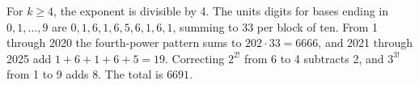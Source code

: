 For $k\ge4$, the exponent is divisible by 4. The units digits for bases ending in $0,1,\ldots,9$ are $0,1,6,1,6,5,6,1,6,1$, summing to 33 per block of ten. From 1 through 2020 the fourth-power pattern sums to $202\cdot33=6666$, and 2021 through 2025 add $1+6+1+6+5=19$. Correcting $2^{2!}$ from 6 to 4 subtracts 2, and $3^{3!}$ from 1 to 9 adds 8. The total is $\boxed{6691}$.
